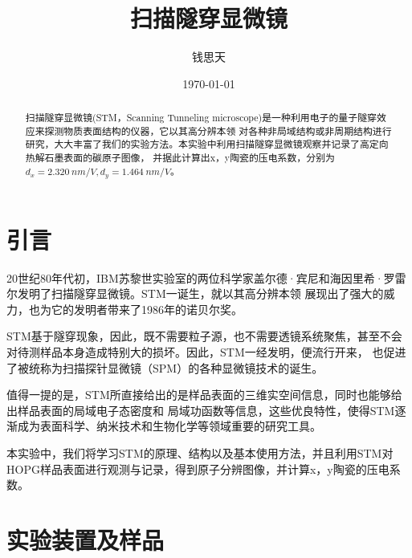 \documentclass[aps,pre,12pt,preprint,onecolumn,showpacs,showkeys]{revtex4-1}
\begin{document}
\title{\bf\heiti{}扫描隧穿显微镜\vspace{15mm}}
\author{\fangsong{}钱思天\vspace{2mm}}
\date{\today}

\begin{abstract}
\vspace{10mm}
\begin{spacing}{1.5}
\songti{}
扫描隧穿显微镜(STM，Scanning Tunneling microscope)是一种利用电子的量子隧穿效应来探测物质表面结构的仪器，它以其高分辨本领
对各种非局域结构或非周期结构进行研究，大大丰富了我们的实验方法。本实验中利用扫描隧穿显微镜观察并记录了高定向热解石墨表面的碳原子图像，
并据此计算出x，y陶瓷的压电系数，分别为$d_x = 2.320\ \si{nm\per V},d_y = 1.464\ \si{nm\per V}$。
\end{spacing}
\end{abstract}
\maketitle
\songti{}


\section{引言}
20世纪80年代初，IBM苏黎世实验室的两位科学家盖尔德·宾尼和海因里希·罗雷尔发明了扫描隧穿显微镜。STM一诞生，就以其高分辨本领
展现出了强大的威力，也为它的发明者带来了1986年的诺贝尔奖。\par
STM基于隧穿现象，因此，既不需要粒子源，也不需要透镜系统聚焦，甚至不会对待测样品本身造成特别大的损坏。因此，STM一经发明，便流行开来，
也促进了被统称为扫描探针显微镜（SPM）的各种显微镜技术的诞生。\par
值得一提的是，STM所直接给出的是样品表面的三维实空间信息，同时也能够给出样品表面的局域电子态密度和
局域功函数等信息，这些优良特性，使得STM逐渐成为表面科学、纳米技术和生物化学等领域重要的研究工具。\par
本实验中，我们将学习STM的原理、结构以及基本使用方法，并且利用STM对HOPG样品表面进行观测与记录，得到原子分辨图像，并计算x，y陶瓷的压电系数。

\section{实验装置及样品}
\end{document}
